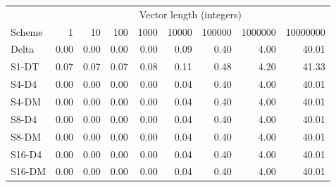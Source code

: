\begin{tabular}{lrrrrrrrr}
\toprule
 & \multicolumn{8}{c}{Vector length (integers)} \\
Scheme & 1 & 10 & 100 & 1000 & 10000 & 100000 & 1000000 & 10000000 \\
\midrule
Delta & 0.00 & 0.00 & 0.00 & 0.00 & 0.09 & 0.40 & 4.00 & 40.01 \\
S1-DT & 0.07 & 0.07 & 0.07 & 0.08 & 0.11 & 0.48 & 4.20 & 41.33 \\
S4-D4 & 0.00 & 0.00 & 0.00 & 0.00 & 0.04 & 0.40 & 4.00 & 40.01 \\
S4-DM & 0.00 & 0.00 & 0.00 & 0.00 & 0.04 & 0.40 & 4.00 & 40.01 \\
S8-D4 & 0.00 & 0.00 & 0.00 & 0.00 & 0.04 & 0.40 & 4.00 & 40.01 \\
S8-DM & 0.00 & 0.00 & 0.00 & 0.00 & 0.04 & 0.40 & 4.00 & 40.01 \\
S16-D4 & 0.00 & 0.00 & 0.00 & 0.00 & 0.04 & 0.40 & 4.00 & 40.01 \\
S16-DM & 0.00 & 0.00 & 0.00 & 0.00 & 0.04 & 0.40 & 4.00 & 40.01 \\
\bottomrule
\end{tabular}
